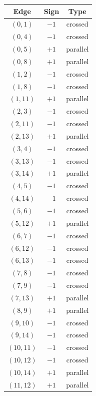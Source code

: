 \begin{tabular}{ccc}
Edge & Sign & Type \\
\hline
$(0,1)$ & $-1$ & crossed \\
$(0,4)$ & $-1$ & crossed \\
$(0,5)$ & $+1$ & parallel \\
$(0,8)$ & $+1$ & parallel \\
$(1,2)$ & $-1$ & crossed \\
$(1,8)$ & $-1$ & crossed \\
$(1,11)$ & $+1$ & parallel \\
$(2,3)$ & $-1$ & crossed \\
$(2,11)$ & $-1$ & crossed \\
$(2,13)$ & $+1$ & parallel \\
$(3,4)$ & $-1$ & crossed \\
$(3,13)$ & $-1$ & crossed \\
$(3,14)$ & $+1$ & parallel \\
$(4,5)$ & $-1$ & crossed \\
$(4,14)$ & $-1$ & crossed \\
$(5,6)$ & $-1$ & crossed \\
$(5,12)$ & $+1$ & parallel \\
$(6,7)$ & $-1$ & crossed \\
$(6,12)$ & $-1$ & crossed \\
$(6,13)$ & $-1$ & crossed \\
$(7,8)$ & $-1$ & crossed \\
$(7,9)$ & $-1$ & crossed \\
$(7,13)$ & $+1$ & parallel \\
$(8,9)$ & $+1$ & parallel \\
$(9,10)$ & $-1$ & crossed \\
$(9,14)$ & $-1$ & crossed \\
$(10,11)$ & $-1$ & crossed \\
$(10,12)$ & $-1$ & crossed \\
$(10,14)$ & $+1$ & parallel \\
$(11,12)$ & $+1$ & parallel \\
\end{tabular}